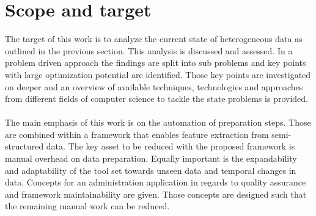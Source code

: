 \section{Scope and target\label{sec:scope}}
The target of this work is to analyze the current state of heterogeneous data as outlined in the previous section. This analysis is discussed and assessed. In a problem driven approach the findings are split into sub problems and key points with large optimization potential are identified. Those key points are investigated on deeper and an overview of available techniques, technologies and approaches from different fields of computer science to tackle the state problems is provided.
\\\\
The main emphasis of this work is on the automation of preparation steps. Those are combined within a framework that enables feature extraction from semi-structured data. The key asset to be reduced with the proposed framework is manual overhead on data preparation. Equally important is the expandability and adaptability of the tool set towards unseen data and temporal changes in data. Concepts for an administration application in regards to quality assurance and framework maintainability are given. Those concepts are designed such that the remaining manual work can be reduced. 

